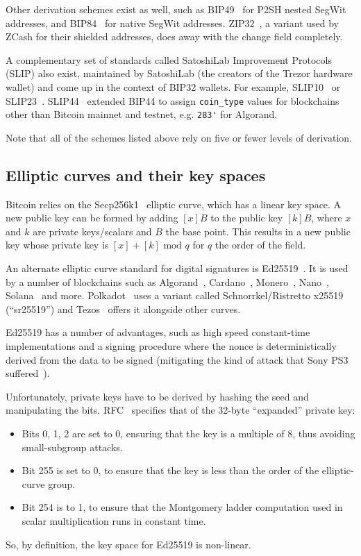 \documentclass[12pt, a4paper, twocolumn]{article}
\begin{document}
Other derivation schemes exist as well, such as BIP49~\cite{BIP49} for P2SH nested SegWit addresses, and BIP84~\cite{BIP84} for native SegWit addresses. ZIP32~\cite{ZIP32}, a variant used by ZCash for their shielded addresses, does away with the change field completely.

A complementary set of standards called SatoshiLab Improvement Protocols (SLIP) also exist, maintained by SatoshiLab (the creators of the Trezor hardware wallet) and come up in the context of BIP32 wallets.
For example, SLIP10~\cite{SLIP10} or SLIP23~\cite{SLIP23}.
SLIP44~\cite{BIP44} extended BIP44 to assign \verb=coin_type= values for blockchains other than Bitcoin mainnet and testnet, e.g. \verb=283'= for Algorand.

Note that all of the schemes listed above rely on five or fewer levels of derivation.

\subsection{Elliptic curves and their key spaces}
\label{subsec:elliptic_curves_and_their_key_spaces}

Bitcoin relies on the Secp256k1~\cite{Secp256k1} elliptic curve, which has a linear key space. A new public key can be formed by adding $[x]B$ to the public key $[k]B$, where $x$ and $k$ are private keys/scalars and $B$ the base point. This results in a new public key whose private key is $[x] + [k] \text{ mod } q$ for $q$ the order of the field.

An alternate elliptic curve standard for digital signatures is Ed25519~\cite{Ed25519}. It is used by a number of blockchains such as Algorand~\cite{AlgorandEd25519}, Cardano~\cite{CardanoEd25519}, Monero~\cite{MoneroEd25519}, Nano~\cite{NanoEd25519}, Solana~\cite{SolanaEd25519} and more. Polkadot~\cite{PolkadotEd25519} uses a variant called Schnorrkel/Ristretto x25519 (``sr25519'') and Tezos~\cite{TezosEd25519} offers it alongside other curves.

Ed25519 has a number of advantages, such as high speed constant-time implementations and a signing procedure where the nonce is deterministically derived from the data to be signed (mitigating the kind of attack that Sony PS3 suffered~\cite{Ed25519}).

Unfortunately, private keys have to be derived by hashing the seed and manipulating the bits.
RFC~\cite{RFC8032} specifies that of the 32-byte ``expanded'' private key:
\begin{itemize}[label=\textendash, itemsep=-0.5em]
\item Bits 0, 1, 2 are set to 0, ensuring that the key is a multiple of 8, thus avoiding small-subgroup attacks.
\item Bit 255 is set to 0, to ensure that the key is less than the order of the elliptic-curve group.
\item Bit 254 is to 1, to ensure that the Montgomery ladder computation used in scalar multiplication runs in constant time.
\end{itemize}
So, by definition, the key space for Ed25519 is non-linear.
\end{document}
